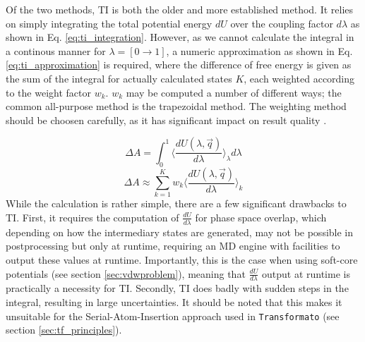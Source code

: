 \documentclass[oneside]{scrreprt}
\begin{document}
Of the two methods, TI is both the older and more established method. It relies on simply integrating the total potential energy $dU$ over the coupling factor $d\lambda$ as shown in Eq. \ref{eq:ti_integration}. However, as we cannot calculate the integral in a continous manner for $\lambda =[0\rightarrow1]$, a numeric approximation as shown in Eq. \ref{eq:ti_approximation} is required, where the difference of free energy is given as the sum of the integral for actually calculated states $K$, each weighted according to the weight factor $w_k$. $w_k$ may be computed a number of different ways; the common all-purpose method is the trapezoidal method. The weighting method should be choosen carefully, as it has significant impact on result quality \cite{boresch_efficiency_2011}.

\begin{equation} \label{eq:ti_integration}
    \Delta A=\int_0^1 \biggl \langle\frac{dU(\lambda,\Vec{q})}{d\lambda} \biggr \rangle_{\lambda} d\lambda 
\end{equation}
\begin{equation} \label{eq:ti_approximation}
    \Delta A \approx \sum_{k=1}^K w_k \biggl \langle\frac{dU(\lambda,\Vec{q})}{d\lambda} \biggr \rangle_{k}
\end{equation}
While the calculation is rather simple, there are a few significant drawbacks to TI. First, it requires the computation of $\frac{dU}{d\lambda}$ for phase space overlap, which depending on how the intermediary states are generated, may not be possible in postprocessing but only at runtime, requiring an MD engine with facilities to output these values at runtime. Importantly, this is the case when using soft-core potentials (see section \ref{sec:vdwproblem}), meaning that $\frac{dU}{d\lambda}$ output at runtime is practically a necessity for TI. Secondly, TI does badly with sudden steps in the integral, resulting in large uncertainties. It should be noted that this makes it unsuitable for the Serial-Atom-Insertion approach used in \texttt{Transformato} (see section \ref{sec:tf_principles}).
\end{document}
